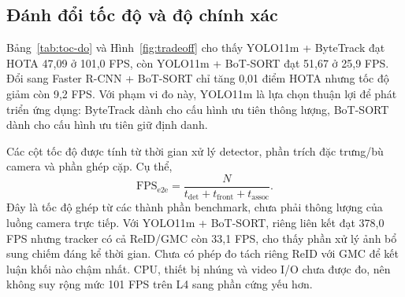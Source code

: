 \documentclass[fontsize=13pt,a4paper,oneside,parskip=false,numbers=noenddot,bibliography=totoc]{scrreprt}
\begin{document}
\subsection{Đánh đổi tốc độ và độ chính xác}
\label{sec:toc-do}

Bảng~\ref{tab:toc-do} và Hình~\ref{fig:tradeoff} cho thấy YOLO11m + ByteTrack đạt HOTA 47,09 ở 101,0 FPS, còn YOLO11m + BoT-SORT đạt 51,67 ở 25,9 FPS. Đổi sang Faster R-CNN + BoT-SORT chỉ tăng 0,01 điểm HOTA nhưng tốc độ giảm còn 9,2 FPS. Với phạm vi đo này, YOLO11m là lựa chọn thuận lợi để phát triển ứng dụng: ByteTrack dành cho cấu hình ưu tiên thông lượng, BoT-SORT dành cho cấu hình ưu tiên giữ định danh.

Các cột tốc độ được tính từ thời gian xử lý detector, phần trích đặc trưng/bù camera và phần ghép cặp. Cụ thể,
\begin{equation}
\mathrm{FPS}_{\mathrm{e2e}}=\frac{N}{t_{\mathrm{det}}+t_{\mathrm{front}}+t_{\mathrm{assoc}}}.
\end{equation}
Đây là tốc độ ghép từ các thành phần benchmark, chưa phải thông lượng của luồng camera trực tiếp. Với YOLO11m + BoT-SORT, riêng liên kết đạt 378,0 FPS nhưng tracker có cả ReID/GMC còn 33,1 FPS, cho thấy phần xử lý ảnh bổ sung chiếm đáng kể thời gian. Chưa có phép đo tách riêng ReID với GMC để kết luận khối nào chậm nhất. CPU, thiết bị nhúng và video I/O chưa được đo, nên không suy rộng mức 101 FPS trên L4 sang phần cứng yếu hơn.
\end{document}
